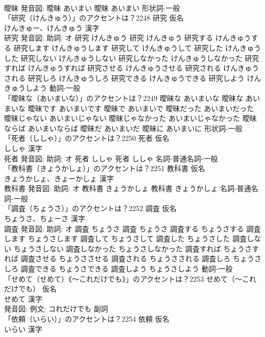 \documentclass[8pt]{extreport}
\begin{document}
\begin{CJK}{UTF8}{min}
\\	曖昧 発音図:	曖昧 あいまい		曖昧 あいまい				形状詞-一般 
\\	「研究（けんきゅう）」のアクセントは？2248	研究 仮名　
\\	けんきゅー、けんきゅう 漢字　
\\	研究 発音図: 助詞: オ	研究 けんきゅう		研究 けんきゅう 研究する けんきゅうする 研究します けんきゅうします 研究して けんきゅうして 研究した けんきゅうした 研究しない けんきゅうしない 研究しなかった けんきゅうしなかった 研究すれば けんきゅうすれば 研究させる けんきゅうさせる 研究される けんきゅうされる 研究しろ けんきゅうしろ 研究できる けんきゅうできる 研究しよう けんきゅうしよう				動詞-一般 
\\	「曖昧な（あいまいな）」のアクセントは？2249		曖昧な あいまいな		曖昧な あいまいな 曖昧です あいまいです 曖昧で あいまいで 曖昧だった あいまいだった 曖昧じゃない あいまいじゃない 曖昧じゃなかった あいまいじゃなかった 曖昧ならば あいまいならば 曖昧だ あいまいだ 曖昧に あいまいに				形状詞-一般 
\\	「死者（ししゃ）」のアクセントは？2250	死者 仮名　
\\	ししゃ 漢字　
\\	死者 発音図: 助詞: オ	死者 ししゃ		死者 ししゃ				名詞-普通名詞-一般 
\\	「教科書（きょうかしょ）」のアクセントは？2251	教科書 仮名　
\\	きょうかしょ、きょーかしょ 漢字　
\\	教科書 発音図: 助詞: オ	教科書 きょうかしょ		教科書 きょうかしょ				名詞-普通名詞-一般 
\\	「調査（ちょうさ）」のアクセントは？2252	調査 仮名　
\\	ちょうさ、ちょーさ 漢字　
\\	調査 発音図: 助詞: オ	調査 ちょうさ		調査 ちょうさ 調査する ちょうさする 調査します ちょうさします 調査して ちょうさして 調査した ちょうさした 調査しない ちょうさしない 調査しなかった ちょうさしなかった 調査すれば ちょうさすれば 調査させる ちょうささせる 調査される ちょうさされる 調査しろ ちょうさしろ 調査できる ちょうさできる 調査しよう ちょうさしよう				動詞-一般 
\\	「せめて（せめて）《〜これだけでも》」のアクセントは？2253	せめて（〜これだけでも） 仮名　
\\	せめて 漢字　
\\	発音図: 例文: コれだけでも							副詞 
\\	「依頼（いらい）」のアクセントは？2254	依頼 仮名　
\\	いらい 漢字　

\end{CJK}
\end{document}
